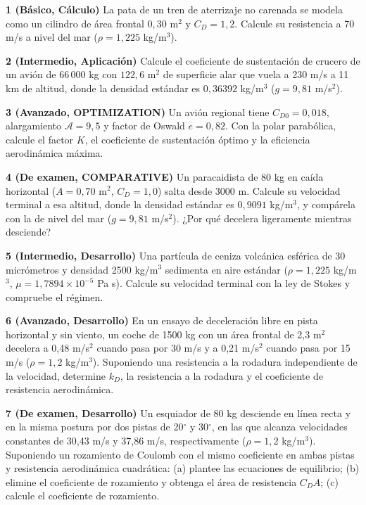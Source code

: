 \documentclass[10pt,openany]{book}
\begin{document}
\begin{tcolorbox}[title={Ejercicios propuestos}, studiumworked, breakable]

\noindent\textbf{1 (Básico, Cálculo)}
La pata de un tren de aterrizaje no carenada se modela como un cilindro de área frontal \(0{,}30\) m\(^2\) y \(C_D = 1{,}2\). Calcule su resistencia a 70 m/s a nivel del mar (\(\rho = 1{,}225\) kg/m\(^3\)).

\noindent\textbf{2 (Intermedio, Aplicación)}
Calcule el coeficiente de sustentación de crucero de un avión de \(66\,000\) kg con \(122{,}6\) m\(^2\) de superficie alar que vuela a 230 m/s a 11 km de altitud, donde la densidad estándar es \(0{,}36392\) kg/m\(^3\) (\(g = 9{,}81\) m/s\(^2\)).

\noindent\textbf{3 (Avanzado, OPTIMIZATION)}
Un avión regional tiene \(C_{D0} = 0{,}018\), alargamiento \(\mathcal{A} = 9{,}5\) y factor de Oswald \(e = 0{,}82\). Con la polar parabólica, calcule el factor \(K\), el coeficiente de sustentación óptimo y la eficiencia aerodinámica máxima.

\noindent\textbf{4 (De examen, COMPARATIVE)}
Un paracaidista de 80 kg en caída horizontal (\(A = 0{,}70\) m\(^2\), \(C_D = 1{,}0\)) salta desde 3000 m. Calcule su velocidad terminal a esa altitud, donde la densidad estándar es \(0{,}9091\) kg/m\(^3\), y compárela con la de nivel del mar (\(g = 9{,}81\) m/s\(^2\)). ¿Por qué decelera ligeramente mientras desciende?

\noindent\textbf{5 (Intermedio, Desarrollo)}
Una partícula de ceniza volcánica esférica de 30 micrómetros y densidad 2500 kg/m\(^3\) sedimenta en aire estándar (\(\rho = 1{,}225\) kg/m\(^3\), \(\mu = 1{,}7894\times 10^{-5}\) Pa s). Calcule su velocidad terminal con la ley de Stokes y compruebe el régimen.

\noindent\textbf{6 (Avanzado, Desarrollo)}
En un ensayo de deceleración libre en pista horizontal y sin viento, un coche de 1500 kg con un área frontal de 2,3 m\(^2\) decelera a 0,48 m/s\(^2\) cuando pasa por 30 m/s y a 0,21 m/s\(^2\) cuando pasa por 15 m/s (\(\rho = 1{,}2\) kg/m\(^3\)). Suponiendo una resistencia a la rodadura independiente de la velocidad, determine \(k_D\), la resistencia a la rodadura y el coeficiente de resistencia aerodinámica.

\noindent\textbf{7 (De examen, Desarrollo)}
Un esquiador de 80 kg desciende en línea recta y en la misma postura por dos pistas de 20\(^\circ\) y 30\(^\circ\), en las que alcanza velocidades constantes de 30,43 m/s y 37,86 m/s, respectivamente (\(\rho = 1{,}2\) kg/m\(^3\)). Suponiendo un rozamiento de Coulomb con el mismo coeficiente en ambas pistas y resistencia aerodinámica cuadrática: (a) plantee las ecuaciones de equilibrio; (b) elimine el coeficiente de rozamiento y obtenga el área de resistencia \(C_D A\); (c) calcule el coeficiente de rozamiento.
\end{tcolorbox}
\end{document}
